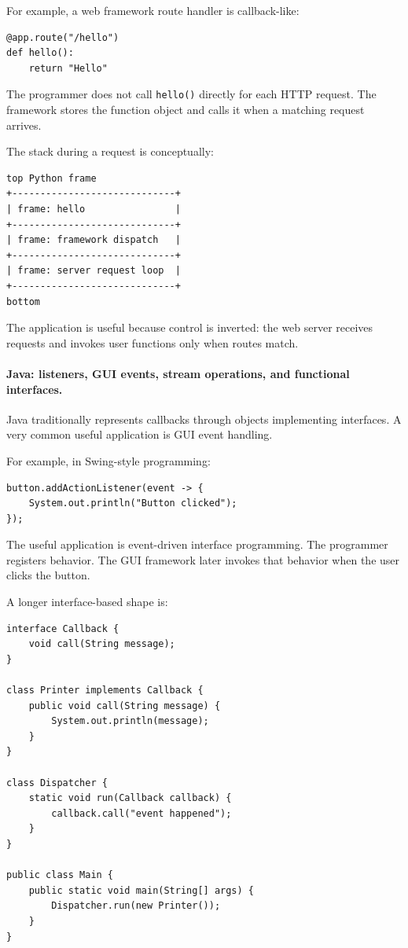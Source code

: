 For example, a web framework route handler is callback-like:

\begin{verbatim}
@app.route("/hello")
def hello():
    return "Hello"
\end{verbatim}

The programmer does not call \texttt{hello()} directly for each HTTP request. The framework stores the function object and calls it when a matching request arrives.

The stack during a request is conceptually:

\begin{verbatim}
top Python frame
+-----------------------------+
| frame: hello                |
+-----------------------------+
| frame: framework dispatch   |
+-----------------------------+
| frame: server request loop  |
+-----------------------------+
bottom
\end{verbatim}

The application is useful because control is inverted: the web server receives requests and invokes user functions only when routes match.

\paragraph{Java: listeners, GUI events, stream operations, and functional interfaces.}

Java traditionally represents callbacks through objects implementing interfaces. A very common useful application is GUI event handling.

For example, in Swing-style programming:

\begin{verbatim}
button.addActionListener(event -> {
    System.out.println("Button clicked");
});
\end{verbatim}

The useful application is event-driven interface programming. The programmer registers behavior. The GUI framework later invokes that behavior when the user clicks the button.

A longer interface-based shape is:

\begin{verbatim}
interface Callback {
    void call(String message);
}

class Printer implements Callback {
    public void call(String message) {
        System.out.println(message);
    }
}

class Dispatcher {
    static void run(Callback callback) {
        callback.call("event happened");
    }
}

public class Main {
    public static void main(String[] args) {
        Dispatcher.run(new Printer());
    }
}
\end{verbatim}

